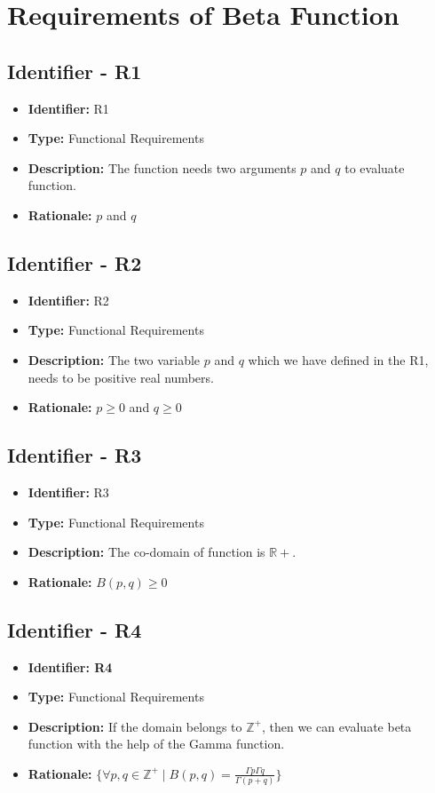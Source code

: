 \documentclass[12pt,report]{article}
\begin{document}
\section{Requirements of Beta Function}
\subsection{Identifier - R1}
\begin{itemize}[noitemsep]
    \item \textbf{Identifier: } R1
    \item \textbf{Type: } Functional Requirements
    \item \textbf{Description: } The function needs two arguments $p$ and $q$ to evaluate function.
    \item \textbf{Rationale: } $p$ and $q$
\end{itemize}
\subsection{Identifier - R2}
\begin{itemize}[noitemsep]
    \item \textbf{Identifier: } R2
    \item \textbf{Type: } Functional Requirements
    \item \textbf{Description: } The two variable $p$ and $q$ which we have defined in the R1, needs to be positive real numbers.
    \item \textbf{Rationale: } $p \geq 0$ and $q \geq 0$
\end{itemize}
\subsection{Identifier - R3}
\begin{itemize}[noitemsep]
    \item \textbf{Identifier: }R3
    \item \textbf{Type: } Functional Requirements
    \item \textbf{Description: } The co-domain of function is $\mathbb R+$.
    \item \textbf{Rationale: } $B(p,q) \geq 0$
\end{itemize}
\subsection{Identifier - R4}
\begin{itemize}[noitemsep]
    \item \textbf{Identifier: R4}
    \item \textbf{Type: }Functional Requirements
    \item \textbf{Description: }If the domain belongs to $\mathbb Z^+$, then we can evaluate beta function with the help of the Gamma function.
    \item \textbf{Rationale: }$\{\forall p,q \in \mathbb Z^+ \mid B(p,q) = \frac{\Gamma p \Gamma q}{\Gamma(p+q)}\}$\cite{BetaFunctionPositive}
\end{itemize}
\end{document}
